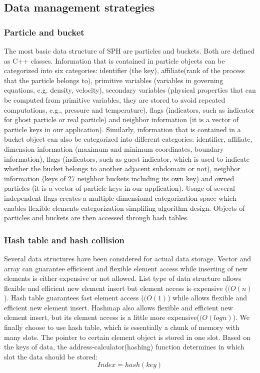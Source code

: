 \subsection{Data management strategies}
\subsubsection{Particle and bucket}
The most basic data structure of SPH are particles and buckets. Both are defined as C++ classes. Information that is contained in particle objects can be categorized into six categories: identifier (the key), affiliate(rank of the process that the particle belongs to), primitive variables (variables in governing equations, e.g. density, velocity), secondary variables (physical properties that can be computed from primitive variables, they are stored to avoid repeated computations, e.g., pressure and temperature), flags (indicators, such as indicator for ghost particle or real particle) and neighbor information (it is a vector of particle keys in our application). Similarly, information that is contained in a bucket object can also be categorized into different categories: identifier, affiliate, dimension information (maximum and minimum coordinates, boundary information), flags (indicators, such as guest indicator, which is used to indicate whether the bucket belongs to another adjacent subdomain or not), neighbor information (keys of 27 neighbor buckets including its own key) and owned particles (it is a vector of particle keys in our application).
Usage of several independent flags creates a multiple-dimensional categorization space which enables flexible elements categorization simplifing algorithm design.
Objects of particles and buckets are then accessed through hash tables.

\subsubsection{Hash table and hash collision}
Several data structures have been considered for actual data storage. Vector and array can guarantee efficicent and flexible element access while inserting of new elements is either expensive or not allowed. List type of data structure allows flexible and efficient new element insert but element access is expensive ($(O(n)$).
Hash table guarantees fast element access ($(O(1)$) while allows flexible and efficient new element insert. Hashmap also allows flexible and efficient new element insert, but its element access is a little more expensive($(O(logn)$). We finally choose to use hash table, which is essentially a chunk of memory with many slots. The pointer to certain element object is stored in one slot. Based on the keys of data, the address-calculator(hashing) function determines in which slot the data should be stored:
\begin{equation}
Index = hash(key)
\end{equation}

